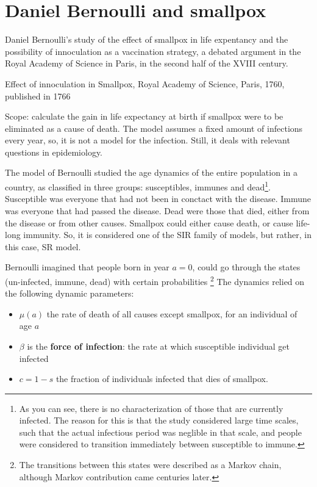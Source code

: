 \section{Daniel Bernoulli and smallpox}

Daniel Bernoulli's study of the effect of smallpox in life expentancy and the possibility of innoculation as a vaccination strategy, a debated argument in the Royal Academy of Science in Paris, in the second half of the XVIII century.

Effect of innoculation in Smallpox, 
Royal Academy of Science, Paris, 1760, published in 1766

Scope: calculate the gain in life expectancy at birth if smallpox were to be eliminated as a cause of death. The model assumes a fixed amount of infections every year, so, it is not a model for the infection. Still, it deals with relevant questions in epidemiology.

The model of Bernoulli studied the age dynamics of the entire population in a country, as classified in three groups: susceptibles, immunes and dead\footnote{ As you can see, there is no characterization of those that are currently infected. The reason for this is that the study considered  large time scales, such that the actual infectious period was neglible in that scale, and people were considered to transition immediately between susceptible to immune.}. Susceptible was everyone that had not been in conctact with the disease. Immune was everyone that had passed the disease. Dead were those that died, either from the disease or from other causes. Smallpox could either cause death, or cause life-long immunity. So, it is considered one of the SIR family of models, but rather, in this case, SR model.

 



Bernoulli imagined that people born in year $a=0$, could go through the states (un-infected, immune, dead) with certain probabilities \footnote{The transitions between this states were described as a Markov chain, although Markov contribution came centuries later.}
The dynamics relied on the following dynamic parameters:
\begin{itemize}
 \item $\mu(a)$ the rate of death of all causes except smallpox, for an individual of age $a$  
 \item $\beta$ is the {\bf force of infection}: the rate at which susceptible individual get infected
 \item $c = 1-s$ the fraction of individuals infected that dies of smallpox.
\end{itemize}

